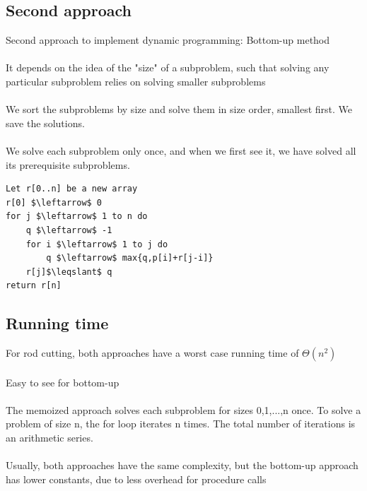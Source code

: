 \documentclass{article}[18pt]
\begin{document}
\subsection{Second approach}
Second approach to implement dynamic programming: Bottom-up method\\
\\
It depends on the idea of the "size" of a subproblem, such that solving any particular subproblem relies on solving smaller subproblems\\
\\
We sort the subproblems by size and solve them in size order, smallest first. We save the solutions.\\
\\
We solve each subproblem only once, and when we first see it, we have solved all its prerequisite subproblems.
\begin{lstlisting}[caption=BOTTOM-UP-ROD({p,n})]
Let r[0..n] be a new array
r[0] $\leftarrow$ 0
for j $\leftarrow$ 1 to n do
	q $\leftarrow$ -1
	for i $\leftarrow$ 1 to j do
		q $\leftarrow$ max{q,p[i]+r[j-i]}
	r[j]$\leqslant$ q
return r[n]
\end{lstlisting}
\subsection{Running time}
For rod cutting, both approaches have a worst case running time of $\Theta(n^2)$\\
\\
Easy to see for bottom-up\\
\\
The memoized approach solves each subproblem for sizes 0,1,...,n once. To solve a problem of size n, the for loop iterates n times. The total number of iterations is an arithmetic series.\\
\\
Usually, both approaches have the same complexity, but the bottom-up approach has lower constants, due to less overhead for procedure calls
\end{document}
